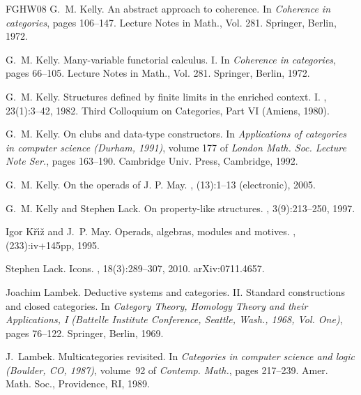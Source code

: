 \documentclass{tac}
\numberwithin{equation}{section}
\begin{document}
\begin{thebibliography}{FGHW08}
G.~M. Kelly.
\newblock An abstract approach to coherence.
\newblock In {\em Coherence in categories}, pages 106--147. Lecture Notes in
  Math., Vol. 281. Springer, Berlin, 1972.

G.~M. Kelly.
\newblock Many-variable functorial calculus. {I}.
\newblock In {\em Coherence in categories}, pages 66--105. Lecture Notes in
  Math., Vol. 281. Springer, Berlin, 1972.

G.~M. Kelly.
\newblock Structures defined by finite limits in the enriched context. {I}.
, 23(1):3--42, 1982.
\newblock Third Colloquium on Categories, Part VI (Amiens, 1980).

G.~M. Kelly.
\newblock On clubs and data-type constructors.
\newblock In {\em Applications of categories in computer science ({D}urham,
  1991)}, volume 177 of {\em London Math. Soc. Lecture Note Ser.}, pages
  163--190. Cambridge Univ. Press, Cambridge, 1992.

G.~M. Kelly.
\newblock On the operads of {J}. {P}. {M}ay.
, (13):1--13 (electronic), 2005.

G.~M. Kelly and Stephen Lack.
\newblock On property-like structures.
, 3(9):213--250, 1997.

Igor K{\v{r}}{\'{\i}}{\v{z}} and J.~P. May.
\newblock Operads, algebras, modules and motives.
, (233):iv+145pp, 1995.

Stephen Lack.
\newblock Icons.
, 18(3):289--307, 2010.
\newblock arXiv:0711.4657.

Joachim Lambek.
\newblock Deductive systems and categories. {II}. {S}tandard constructions and
  closed categories.
\newblock In {\em Category {T}heory, {H}omology {T}heory and their
  {A}pplications, {I} ({B}attelle {I}nstitute {C}onference, {S}eattle, {W}ash.,
  1968, {V}ol. {O}ne)}, pages 76--122. Springer, Berlin, 1969.

J.~Lambek.
\newblock Multicategories revisited.
\newblock In {\em Categories in computer science and logic ({B}oulder, {CO},
  1987)}, volume~92 of {\em Contemp. Math.}, pages 217--239. Amer. Math. Soc.,
  Providence, RI, 1989.


\end{thebibliography}
\end{document}

